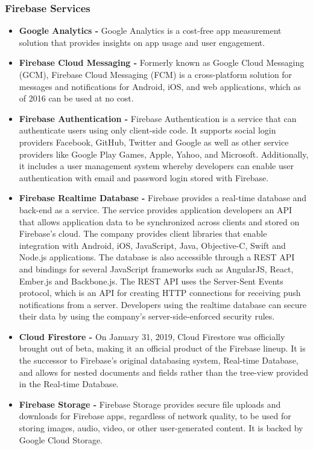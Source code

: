 \documentclass[14pt]{report}
\begin{document}
				\subsubsection{Firebase Services}
					\begin{itemize}
						\item \textbf{Google Analytics - }Google Analytics is a cost-free app measurement solution that provides insights on app usage and user engagement.
						\item \textbf{Firebase Cloud Messaging - }Formerly known as Google Cloud Messaging (GCM), Firebase Cloud Messaging (FCM) is a cross-platform solution for messages and notifications for Android, iOS, and web applications, which as of 2016 can be used at no cost.						
						\item \textbf{Firebase Authentication - }Firebase Authentication is a service that can authenticate users using only client-side code. It supports social login providers Facebook, GitHub, Twitter and Google as well as other service providers like Google Play Games, Apple, Yahoo, and Microsoft. Additionally, it includes a user management system whereby developers can enable user authentication with email and password login stored with Firebase.
						\item \textbf{Firebase Realtime Database - }Firebase provides a real-time database and back-end as a service. The service provides application developers an API that allows application data to be synchronized across clients and stored on Firebase's cloud. The company provides client libraries that enable integration with Android, iOS, JavaScript, Java, Objective-C, Swift and Node.js applications. The database is also accessible through a REST API and bindings for several JavaScript frameworks such as AngularJS, React, Ember.js and Backbone.js. The REST API uses the Server-Sent Events protocol, which is an API for creating HTTP connections for receiving push notifications from a server. Developers using the realtime database can secure their data by using the company's server-side-enforced security rules.
						\item \textbf{Cloud Firestore - }On January 31, 2019, Cloud Firestore was officially brought out of beta, making it an official product of the Firebase lineup. It is the successor to Firebase's original databasing system, Real-time Database, and allows for nested documents and fields rather than the tree-view provided in the Real-time Database.
						\item \textbf{Firebase Storage - }Firebase Storage provides secure file uploads and downloads for Firebase apps, regardless of network quality, to be used for storing images, audio, video, or other user-generated content. It is backed by Google Cloud Storage.

\end{itemize}
\end{document}
